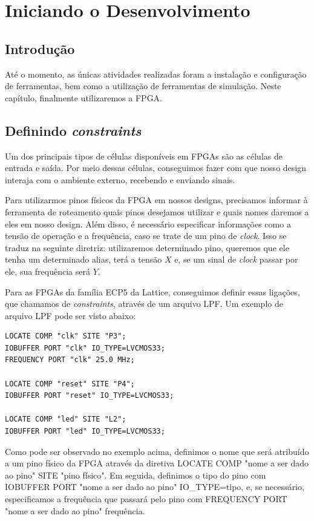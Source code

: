 \documentclass{report}
\begin{document}
\chapter{Iniciando o Desenvolvimento}

\section{Introdução}

Até o momento, as únicas atividades realizadas foram a instalação e configuração de ferramentas, bem como a utilização de ferramentas de simulação. Neste capítulo, finalmente utilizaremos a FPGA.

\section{Definindo \textit{constraints}}

Um dos principais tipos de células disponíveis em FPGAs são as células de entrada e saída. Por meio dessas células, conseguimos fazer com que nosso design interaja com o ambiente externo, recebendo e enviando sinais.

Para utilizarmos pinos físicos da FPGA em nossos designs, precisamos informar à ferramenta de roteamento quais pinos desejamos utilizar e quais nomes daremos a eles em nosso design. Além disso, é necessário especificar informações como a tensão de operação e a frequência, caso se trate de um pino de \textit{clock}. Isso se traduz na seguinte diretriz: utilizaremos determinado pino, queremos que ele tenha um determinado alias, terá a tensão \(X\) e, se um sinal de \textit{clock} passar por ele, sua frequência será \(Y\).

Para as FPGAs da família ECP5 da Lattice, conseguimos definir essas ligações, que chamamos de \textit{constraints}, através de um arquivo LPF. Um exemplo de arquivo LPF pode ser visto abaixo:

\begin{lstlisting}[language=LPF, caption={Exemplo de arquivo .lpf}]
LOCATE COMP "clk" SITE "P3";
IOBUFFER PORT "clk" IO_TYPE=LVCMOS33;
FREQUENCY PORT "clk" 25.0 MHz;

LOCATE COMP "reset" SITE "P4";
IOBUFFER PORT "reset" IO_TYPE=LVCMOS33;

LOCATE COMP "led" SITE "L2";
IOBUFFER PORT "led" IO_TYPE=LVCMOS33;
\end{lstlisting}

Como pode ser observado no exemplo acima, definimos o nome que será atribuído a um pino físico da FPGA através da diretiva LOCATE COMP "nome a ser dado ao pino" SITE "pino físico". Em seguida, definimos o tipo do pino com IOBUFFER PORT "nome a ser dado ao pino" IO\_TYPE=tipo, e, se necessário, especificamos a frequência que passará pelo pino com FREQUENCY PORT "nome a ser dado ao pino" frequência.
\end{document}
